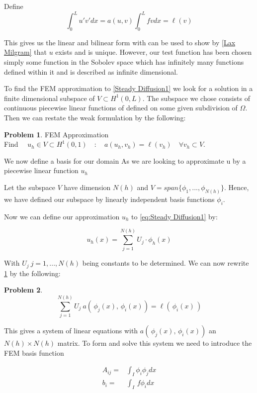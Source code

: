\documentclass{uonmathreport}
\theoremstyle{definition}
\theoremstyle{problem}
\newtheorem{problem}{Problem}[section]
\theoremstyle{theorem}
\begin{document}
Define 
\begin{equation*}
\int_0^L  u' v'  dx = a(u, v)  	
\int_0^L  f v dx  =  \ell(v)
\end{equation*}

This gives us the linear and bilinear form with can be used to show by \ref{Lax Milgram} that $u$ exists and is unique. However, our test function has been chosen simply some function in the Sobolev space which has infinitely many functions defined within it and is described as infinite dimensional. 

To find the FEM approximation to \ref{Steady Diffusion1} we look for a solution in a finite dimensional subspace of $V\subset H^1(0, L) $. The subspace we chose consists of continuous piecewise linear functions of defined on some given subdivision of $\Omega$. Then we can restate the weak formulation by the following:

\begin{problem}{FEM Approximation} \label{prob:Approx1}\\
Find $\quad u_h \in  V\subset H^1(0, 1) \quad : \quad a(u_h, v_h) =  \ell(v_h) \quad \forall v_h \subset V.$
\end{problem}

We now define a basis for our domain 
As we are looking to approximate u by a piecewise linear function $u_h$ 

Let the subspace $V$ have dimension $N(h)$ and $V = span\{\phi_1, ..., \phi_{N(h)}\}$. Hence, we have defined our subspace by linearly independent basis functions $\phi_i$.

Now we can define our approximation $u_h$ to \ref{eq:Steady Diffusion1} by:

\begin{equation*}
u_h(x) = \sum_{j=1}^{N(h)} U_j \cdot \phi_h(x)
\end{equation*}

With $U_j \: j = 1, ..., N(h)$ being constants to be determined. We can now rewrite \ref{prob:Approx1} by the following:

\begin{problem}
$$\sum_{j=1}^{N(h)}U_j \: a( \,\phi_j(x),\, \phi_i(x)) = \ell(\,\phi_i(x)\,) $$
\end{problem}

This gives a system of linear equations with $a( \,\phi_j(x),\, \phi_i(x))$ an $N(h)\times N(h)$ matrix. To form and solve this system we need to introduce the FEM basis function 

\begin{subequations} 
\begin{align}
A_{ij} =& \int_I \phi_i \phi_j dx \label{eq:stiff}\\
b_i =& \int_I  \, f\phi_i dx
\end{align}
\end{subequations}
\end{document}
